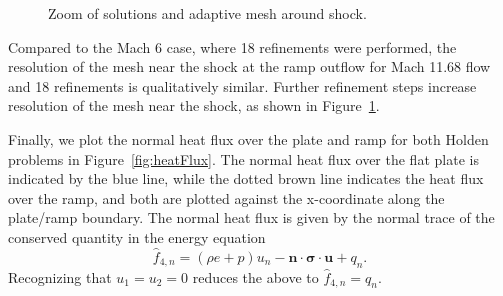 \begin{figure}
\centering
{}
\caption{Zoom of solutions and adaptive mesh around shock. }
\label{fig:holdenMa11Zoom}
\end{figure}

Compared to the Mach 6 case, where 18 refinements were performed, the resolution of the mesh near the shock at the ramp outflow for Mach 11.68 flow and 18 refinements is qualitatively similar.  Further refinement steps increase resolution of the mesh near the shock, as shown in Figure~\ref{fig:holdenMa11Zoom}.  

Finally, we plot the normal heat flux over the plate and ramp for both Holden problems in Figure~\ref{fig:heatFlux}.  The normal heat flux over the flat plate is indicated by the blue line, while the dotted brown line indicates the heat flux over the ramp, and both are plotted against the x-coordinate along the plate/ramp boundary.  The normal heat flux is given by the normal trace of the conserved quantity in the energy equation
\[
\widehat{f}_{4,n} = (\rho e+p)u_n - \boldsymbol n\cdot \boldsymbol \sigma\cdot \boldsymbol u + q_n.
\]
Recognizing that $u_1 = u_2 = 0$ reduces the above to $\widehat{f}_{4,n} = q_n$.  

